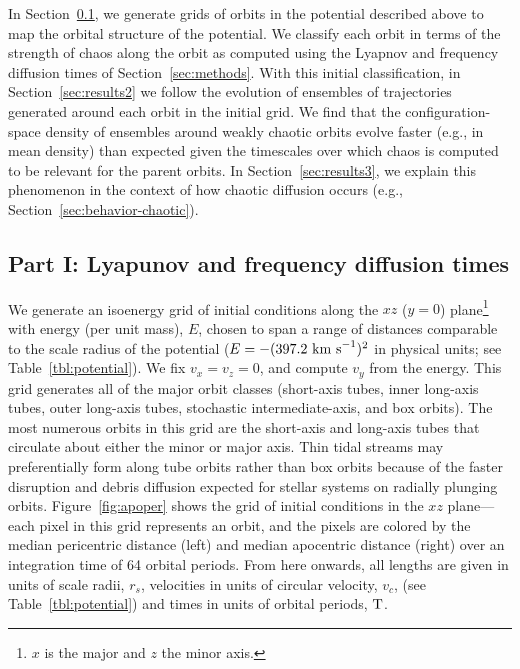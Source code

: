 In Section~\ref{sec:results1}, we generate grids of orbits in the potential
described above to map the orbital structure of the potential. We classify each
orbit in terms of the strength of chaos along the orbit as computed using the
Lyapnov and frequency diffusion times of Section~\ref{sec:methods}. With this
initial classification, in Section~\ref{sec:results2} we follow the evolution of
ensembles of trajectories generated around each orbit in the initial grid. We
find that the configuration-space density of ensembles around weakly chaotic
orbits evolve faster (e.g., in mean density) than expected given the timescales
over which chaos is computed to be relevant for the parent orbits. In
Section~\ref{sec:results3}, we explain this phenomenon in the context of how
chaotic diffusion occurs (e.g., Section~\ref{sec:behavior-chaotic}).

\subsection{Part I: Lyapunov and frequency diffusion times}\label{sec:results1}

We generate an isoenergy grid of initial conditions along the $xz$ ($y=0$)
plane\footnote{$x$ is the major and $z$ the minor axis.} with energy (per unit
mass), $E$, chosen to span a range of distances comparable to the scale radius
of the potential ($E=-(397.2~{\rm km~s}^{-1})^2$ in physical units; see
Table~\ref{tbl:potential}). We fix $v_x = v_z = 0$, and compute $v_y$ from the
energy. This grid generates all of the major orbit classes (short-axis tubes,
inner long-axis tubes, outer long-axis tubes, stochastic intermediate-axis, and
box orbits). The most numerous orbits in this grid are the short-axis and
long-axis tubes that circulate about either the minor or major axis. Thin tidal
streams may preferentially form along tube orbits rather than box orbits because
of the faster disruption and debris diffusion expected for stellar systems on
radially plunging orbits. Figure~\ref{fig:apoper} shows the grid of initial
conditions in the $xz$ plane---each pixel in this grid represents an orbit, and
the pixels are colored by the median pericentric distance (left) and median
apocentric distance (right) over an integration time of 64 orbital periods. From
here onwards, all lengths are given in units of scale radii, $r_s$, velocities
in units of circular velocity, $v_c$, (see Table~\ref{tbl:potential}) and times
in units of orbital periods, ${\rm T}$.


